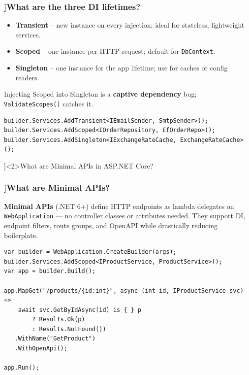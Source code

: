 \begin{frame}[fragile]
  \frametitle{\AnswerTitle[\CategoryBadge[AspNetColor!20]{ASP.NET Core}]{What are the three DI lifetimes?}}

  {\footnotesize
  \begin{itemize}
    \item \textbf{Transient} – new instance on every injection; ideal for stateless, lightweight services.
    \item \textbf{Scoped} – one instance per HTTP request; default for \texttt{DbContext}.
    \item \textbf{Singleton} – one instance for the app lifetime; use for caches or config readers.
  \end{itemize}
  Injecting Scoped into Singleton is a \textbf{captive dependency} bug; \texttt{ValidateScopes()} catches it.
  }

  \begin{verbatim}
builder.Services.AddTransient<IEmailSender, SmtpSender>();
builder.Services.AddScoped<IOrderRepository, EfOrderRepo>();
builder.Services.AddSingleton<IExchangeRateCache, ExchangeRateCache>();
  \end{verbatim}
\end{frame}

\QuestionSlide[\CategoryBadge[AspNetColor!20]{ASP.NET Core}]<2>{What are Minimal APIs in ASP.NET Core?}

\begin{frame}[fragile]
  \frametitle{\AnswerTitle[\CategoryBadge[AspNetColor!20]{ASP.NET Core}]{What are Minimal APIs?}}

  {\footnotesize
  \textbf{Minimal APIs} (.NET 6+) define HTTP endpoints as lambda delegates on \texttt{WebApplication} — no controller classes or attributes needed. They support DI, endpoint filters, route groups, and OpenAPI while drastically reducing boilerplate.
  }

  \begin{verbatim}
var builder = WebApplication.CreateBuilder(args);
builder.Services.AddScoped<IProductService, ProductService>();
var app = builder.Build();

app.MapGet("/products/{id:int}", async (int id, IProductService svc) =>
    await svc.GetByIdAsync(id) is { } p
        ? Results.Ok(p)
        : Results.NotFound())
   .WithName("GetProduct")
   .WithOpenApi();

app.Run();
  \end{verbatim}
\end{frame}

